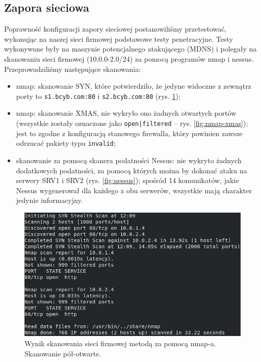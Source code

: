 \documentclass{eiti-raport}
\begin{document}
\subsection{Zapora sieciowa} \label{sec:testy-firewall}
Poprawność konfiguracji zapory sieciowej postanowiliśmy przetestować, wykonując na naszej sieci firmowej podstawowe testy penetracyjne. Testy wykonywane były na maszynie potencjalnego atakującego (MDNS) i polegały na skanowaniu sieci firmowej (10.0.0-2.0/24) za pomocą programów nmap i nessus. Przeprowadziliśmy następujące skanowania:
\begin{itemize}
	\item nmap: skanowanie SYN, które potwierdziło, że jedyne widoczne z zewnątrz porty to \texttt{s1.bcyb.com:80} i \texttt{s2.bcyb.com:80} (rys. \ref{fig:nmap});
	\item nmap: skanowanie XMAS, nie wykryło ono żadnych otwartych portów (wszystkie zostały oznaczone jako \texttt{open|filtered} -- rys. \ref{fig:nmap-xmas}); jest to zgodne z konfiguracją stanowego firewalla, który powinien zawsze odrzucać pakiety typu \texttt{invalid}; 
	\item skanowanie za pomocą skanera podatności Nessus: nie wykryto żadnych dodatkowych podatności, za pomocą których można by dokonać ataku na serwery SRV1 i SRV2 (rys. \ref{fig:nessus}); spośród 14 komunikatów, jakie Nessus wygenerował dla każdego z obu serwerów, wszystkie mają charakter jedynie informacyjny. 
\end{itemize}

\begin{figure}[!h] \centering
	\includegraphics[width=0.95\linewidth]{img/nmap.PNG}
	\caption{Wynik skanowania sieci firmowej metodą za pomocą nmap-a. Skanowanie pół-otwarte.} \label{fig:nmap}
\end{figure}
\end{document}
